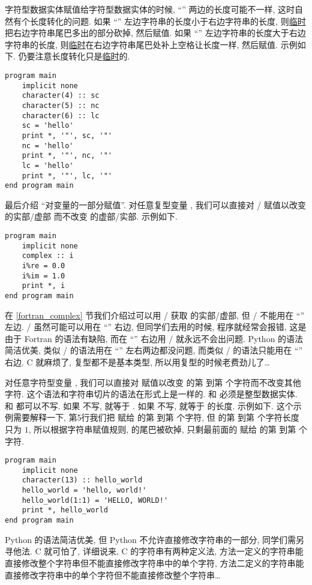字符型数据实体赋值给字符型数据实体的时候, ``\ttt{=}'' 两边的长度可能不一样, 这时自然有个长度转化的问题. 如果 ``\ttt{=}'' 左边字符串的长度小于右边字符串的长度, 则\uline{临时}把右边字符串尾巴多出的部分砍掉, 然后赋值. 如果 ``\ttt{=}'' 左边字符串的长度大于右边字符串的长度, 则\uline{临时}在右边字符串尾巴处补上空格让长度一样, 然后赋值. 示例如下. 仍要注意长度转化只是\uline{临时}的.
\begin{lstlisting}
program main
    implicit none
    character(4) :: sc
    character(5) :: nc
    character(6) :: lc
    sc = 'hello'
    print *, '"', sc, '"'
    nc = 'hello'
    print *, '"', nc, '"'
    lc = 'hello'
    print *, '"', lc, '"'
end program main
\end{lstlisting}

最后介绍 ``对变量的一部分赋值''. 对任意复型变量 \ttt{[z]}, 我们可以直接对 / 赋值以改变 \ttt{[z]} 的实部/虚部 而不改变 \ttt{[z]} 的虚部/实部. 示例如下.
\begin{lstlisting}
program main
    implicit none
    complex :: i
    i%re = 0.0
    i%im = 1.0
    print *, i
end program main
\end{lstlisting}
在 \ref{fortran_complex} 节我们介绍过可以用 / 获取 \ttt{[z]} 的实部/虚部, 但 / 不能用在 ``\ttt{=}'' 左边. / 虽然可能可以用在 ``\ttt{=}'' 右边, 但同学们去用的时候, 程序就经常会报错, 这是由于 Fortran 的语法有缺陷, 而在 ``\ttt{=}'' 右边用 / 就永远不会出问题. Python 的语法简洁优美, 类似 / 的语法用在 ``\ttt{=}'' 左右两边都没问题, 而类似 / 的语法只能用在 ``\ttt{=}'' 右边. C 就麻烦了, 复型都不是基本类型, 所以用复型的时候老费劲儿了\dots{}

对任意字符型变量 \ttt{[c]}, 我们可以直接对  赋值以改变 \ttt{[c]} 的第  到第  个字符而不改变其他字符. 这个语法和字符串切片的语法在形式上是一样的.  和  必须是整型数据实体.  和  都可以不写. 如果  不写,  就等于 . 如果  不写,  就等于 \ttt{[c]} 的长度. 示例如下. 这个示例需要解释一下, 第5行我们把  赋给  的第  到第  个字符, 但  的第  到第  个字符长度只为 $1$, 所以根据字符串赋值规则,  的尾巴被砍掉, 只剩最前面的  赋给 的第  到第  个字符.
\begin{lstlisting}
program main
    implicit none
    character(13) :: hello_world
    hello_world = 'hello, world!'
    hello_world(1:1) = 'HELLO, WORLD!'
    print *, hello_world
end program main
\end{lstlisting}
Python 的语法简洁优美, 但 Python 不允许直接修改字符串的一部分, 同学们需另寻他法. C 就可怕了, 详细说来, C 的字符串有两种定义法, 方法一定义的字符串能直接修改整个字符串但不能直接修改字符串中的单个字符, 方法二定义的字符串能直接修改字符串中的单个字符但不能直接修改整个字符串\dots{}

